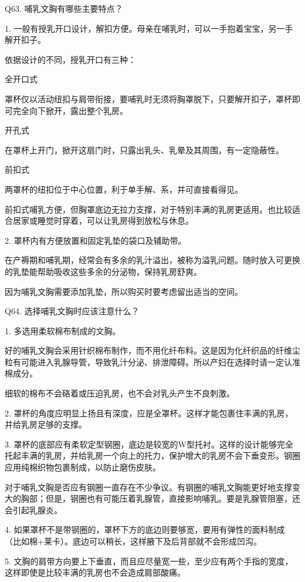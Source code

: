 \documentclass[12pt,UTF8]{ctexbook}
\begin{document}
Q63. 哺乳文胸有哪些主要特点？


1. 一般有授乳开口设计，解扣方便。母亲在哺乳时，可以一手抱着宝宝，另一手解开扣子。


依据设计的不同，授乳开口有三种：

全开口式

罩杯仅以活动纽扣与肩带衔接，要哺乳时无须将胸罩脱下，只要解开扣子，罩杯即可完全向下掀开，露出整个乳房。

开孔式

在罩杯上开门，掀开这扇门时，只露出乳头、乳晕及其周围，有一定隐蔽性。

前扣式

两罩杯的纽扣位于中心位置，利于单手解、系，并可直接看得见。

前扣式哺乳方便，但胸罩底边无拉力支撑，对于特别丰满的乳房更适用。也比较适合居家或睡觉时穿着，可以让乳房得到放松与休息。


2. 罩杯内有方便放置和固定乳垫的袋口及辅助带。

在产褥期和哺乳期，经常会有多余的乳汁溢出，被称为溢乳问题。随时放入可更换的乳垫能帮助吸收这些多余的分泌物，保持乳房舒爽。

因为哺乳文胸需要添加乳垫，所以购买时要考虑留出适当的空间。





Q64. 选择哺乳文胸时应该注意什么？


1. 多选用柔软棉布制成的文胸。

好的哺乳文胸会采用针织棉布制作，而不用化纤布料。这是因为化纤织品的纤维尘粒有可能进入乳腺导管，导致乳汁分泌、排泄障碍。所以产妇在选择时请一定认准棉成分。

细软的棉布不会硌着或压迫乳房，也不会对乳头产生不良刺激。


2. 罩杯的角度应明显上扬且有深度，应是全罩杯。这样才能包裹住丰满的乳房，并给乳房足够的支撑。


3. 罩杯的底部应有柔软定型钢圈，底边是较宽的W型托衬。这样的设计能够完全托起丰满的乳房，并给乳房一个向上的托力，保护增大的乳房不会下垂变形。钢圈应用纯棉织物包裹制成，以防止磨伤皮肤。

对于哺乳文胸是否应有钢圈一直存在不少争议。有钢圈的哺乳文胸能更好地支撑变大的胸部；但是，钢圈也有可能压着乳腺管，直接影响哺乳。要是乳腺管阻塞，还会引起乳腺炎。


4. 如果罩杯不是带钢圈的，罩杯下方的底边则要够宽，要用有弹性的面料制成（比如棉+莱卡）。底边可以稍长，这样腋下及后背部就不会形成凹沟。


5. 文胸的肩带方向要上下垂直，而且应尽量宽一些，至少应有两个手指的宽度，这样即使是比较丰满的乳房也不会造成肩部酸痛。
\end{document}
